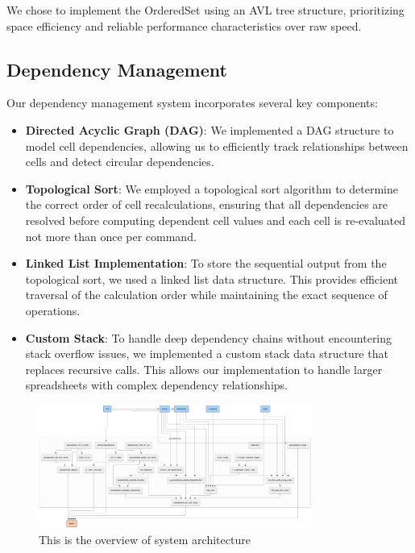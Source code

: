 \documentclass[10pt,a4paper]{article}  %
\begin{document}
We chose to implement the OrderedSet using an AVL tree structure, prioritizing space efficiency and reliable performance characteristics over raw speed.

\subsection{Dependency Management}
Our dependency management system incorporates several key components:

\begin{itemize}
    \item \textbf{Directed Acyclic Graph (DAG)}: We implemented a DAG structure to model cell dependencies, allowing us to efficiently track relationships between cells and detect circular dependencies.
    
    \item \textbf{Topological Sort}: We employed a topological sort algorithm to determine the correct order of cell recalculations, ensuring that all dependencies are resolved before computing dependent cell values and each cell is re-evaluated not more than once per command.
    
    \item \textbf{Linked List Implementation}: To store the sequential output from the topological sort, we used a linked list data structure. This provides efficient traversal of the calculation order while maintaining the exact sequence of operations.
    
    \item \textbf{Custom Stack}: To handle deep dependency chains without encountering stack overflow issues, we implemented a custom stack data structure that replaces recursive calls. This allows our implementation to handle larger spreadsheets with complex dependency relationships.
\end{itemize}

\begin{figure}[h!]
    \centering
    \includegraphics[width=0.8\textwidth]{sysarch.png}
    \caption{This is the overview of system architecture}
    \label{fig:system_architecture}
\end{figure}
\end{document}
